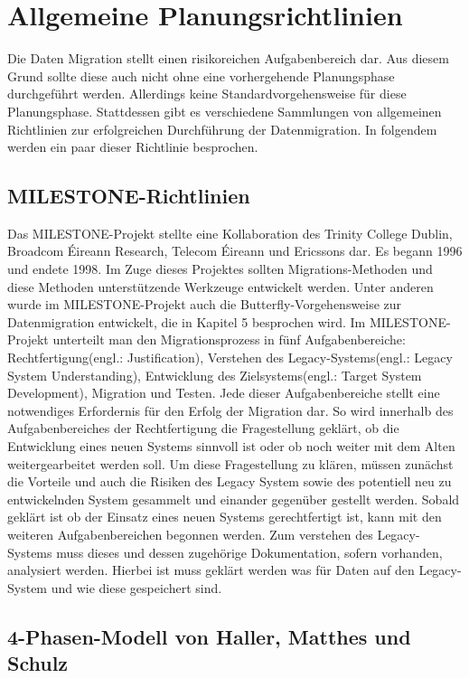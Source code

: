 \section{Allgemeine Planungsrichtlinien}

Die Daten Migration stellt einen risikoreichen Aufgabenbereich dar. Aus diesem Grund sollte diese auch nicht ohne eine vorhergehende Planungsphase durchgeführt werden. Allerdings keine Standardvorgehensweise für diese Planungsphase.\cite[vgl.][S. 3]{wuLawless-1997} Stattdessen gibt es verschiedene Sammlungen von allgemeinen Richtlinien zur erfolgreichen Durchführung der Datenmigration. In folgendem werden ein paar dieser Richtlinie besprochen.

\subsection{MILESTONE-Richtlinien}


Das MILESTONE-Projekt stellte eine Kollaboration des Trinity College Dublin, Broadcom Éireann Research, Telecom Éireann und Ericssons dar. Es begann 1996 und endete 1998. Im Zuge dieses Projektes sollten Migrations-Methoden und diese Methoden unterstützende Werkzeuge entwickelt werden.\cite[vgl.][S. 3]{wuLawless-1997} Unter anderen wurde im MILESTONE-Projekt auch die Butterfly-Vorgehensweise zur Datenmigration entwickelt, die in Kapitel 5 besprochen wird.\cite[vgl.][S. 3]{wuLawless-1997} 
\lb
Im MILESTONE-Projekt unterteilt man den Migrationsprozess in fünf Aufgabenbereiche: Rechtfertigung(engl.: Justification), Verstehen des Legacy-Systems(engl.: Legacy System Understanding), Entwicklung des Zielsystems(engl.: Target System Development), Migration und Testen.\cite[vgl.][S. 3]{wuLawless-1997} Jede dieser Aufgabenbereiche stellt eine notwendiges Erfordernis für den Erfolg der Migration dar. So wird innerhalb des Aufgabenbereiches der Rechtfertigung die Fragestellung geklärt, ob die Entwicklung eines neuen Systems sinnvoll ist oder ob noch weiter mit dem Alten weitergearbeitet werden soll. Um diese Fragestellung zu klären, müssen zunächst die Vorteile und auch die Risiken des Legacy System sowie des potentiell neu zu entwickelnden System gesammelt und einander gegenüber gestellt werden.\cite[vgl.][S. 3]{wuLawless-1997}
\lb
Sobald geklärt ist ob der Einsatz eines neuen Systems gerechtfertigt ist, kann mit den weiteren Aufgabenbereichen begonnen werden. Zum verstehen des Legacy-Systems muss dieses und dessen zugehörige Dokumentation, sofern vorhanden, analysiert werden. Hierbei ist muss geklärt werden was für Daten auf den Legacy-System und wie diese gespeichert sind.\cite[vgl.][S. 3f]{wuLawless-1997} 


\subsection{4-Phasen-Modell von Haller, Matthes und Schulz}